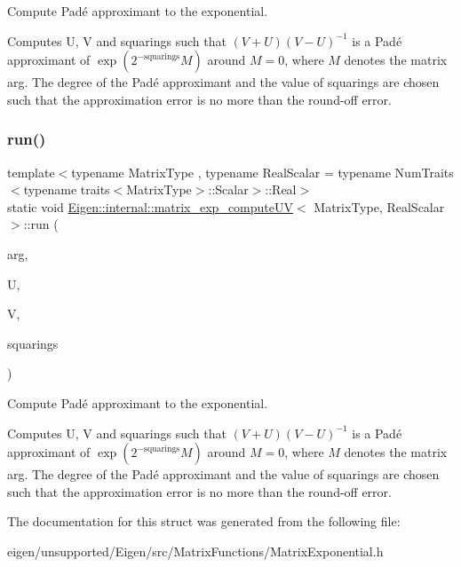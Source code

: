 Compute Pad\'{e} approximant to the exponential. 

Computes {\ttfamily U}, {\ttfamily V} and {\ttfamily squarings} such that $ (V+U)(V-U)^{-1} $ is a Pad\'{e} approximant of $ \exp(2^{-\mbox{squarings}}M) $ around $ M = 0 $, where $ M $ denotes the matrix {\ttfamily arg}. The degree of the Pad\'{e} approximant and the value of squarings are chosen such that the approximation error is no more than the round-\/off error. \mbox{\label{struct_eigen_1_1internal_1_1matrix__exp__compute_u_v_a7847531ae0fccc8ec7648f95846c8adb}} 
\subsubsection{\texorpdfstring{run()}{run()}\hspace{0.1cm}{\footnotesize\ttfamily [2/2]}}
{\footnotesize\ttfamily template$<$typename Matrix\+Type , typename Real\+Scalar  = typename Num\+Traits$<$typename traits$<$\+Matrix\+Type$>$\+::\+Scalar$>$\+::\+Real$>$ \\
static void \hyperlink{struct_eigen_1_1internal_1_1matrix__exp__compute_u_v}{Eigen\+::internal\+::matrix\+\_\+exp\+\_\+compute\+UV}$<$ Matrix\+Type, Real\+Scalar $>$\+::run (\begin{DoxyParamCaption}\item[{const Matrix\+Type \&}]{arg,  }\item[{Matrix\+Type \&}]{U,  }\item[{Matrix\+Type \&}]{V,  }\item[{int \&}]{squarings }\end{DoxyParamCaption})\hspace{0.3cm}{\ttfamily [static]}}



Compute Pad\'{e} approximant to the exponential. 

Computes {\ttfamily U}, {\ttfamily V} and {\ttfamily squarings} such that $ (V+U)(V-U)^{-1} $ is a Pad\'{e} approximant of $ \exp(2^{-\mbox{squarings}}M) $ around $ M = 0 $, where $ M $ denotes the matrix {\ttfamily arg}. The degree of the Pad\'{e} approximant and the value of squarings are chosen such that the approximation error is no more than the round-\/off error. 

The documentation for this struct was generated from the following file\+:\begin{DoxyCompactItemize}
\item 
eigen/unsupported/\+Eigen/src/\+Matrix\+Functions/\+Matrix\+Exponential.\+h\end{DoxyCompactItemize}
